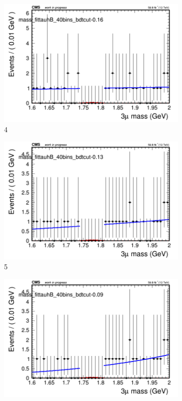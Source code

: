 \begin{figure}[h!]
\begin{subfigure}{0.2\textwidth}
        \includegraphics[width=\textwidth]{power_law/plots/tauhB/massfit_tauhB_40bins_bdtcut-0.16.png}
        \caption{4}
    \end{subfigure}
    \begin{subfigure}{0.2\textwidth}
        \includegraphics[width=\textwidth]{power_law/plots/tauhB/massfit_tauhB_40bins_bdtcut-0.13.png}
        \caption{5}
    \end{subfigure}
    \begin{subfigure}{0.2\textwidth}
        \includegraphics[width=\textwidth]{power_law/plots/tauhB/massfit_tauhB_40bins_bdtcut-0.09.png}

\end{subfigure}
\end{figure}
